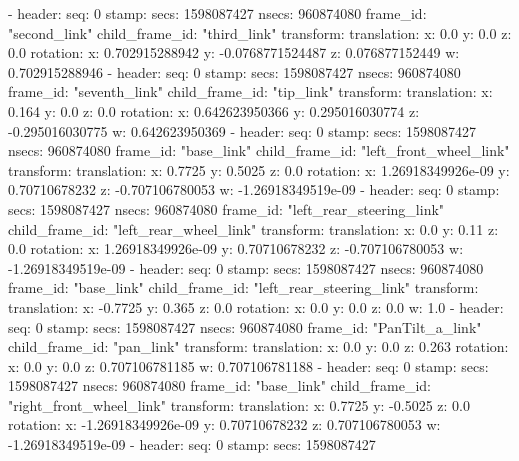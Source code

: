   - 
    header: 
      seq: 0
      stamp: 
        secs: 1598087427
        nsecs: 960874080
      frame_id: "second_link"
    child_frame_id: "third_link"
    transform: 
      translation: 
        x: 0.0
        y: 0.0
        z: 0.0
      rotation: 
        x: 0.702915288942
        y: -0.0768771524487
        z: 0.076877152449
        w: 0.702915288946
  - 
    header: 
      seq: 0
      stamp: 
        secs: 1598087427
        nsecs: 960874080
      frame_id: "seventh_link"
    child_frame_id: "tip_link"
    transform: 
      translation: 
        x: 0.164
        y: 0.0
        z: 0.0
      rotation: 
        x: 0.642623950366
        y: 0.295016030774
        z: -0.295016030775
        w: 0.642623950369
  - 
    header: 
      seq: 0
      stamp: 
        secs: 1598087427
        nsecs: 960874080
      frame_id: "base_link"
    child_frame_id: "left_front_wheel_link"
    transform: 
      translation: 
        x: 0.7725
        y: 0.5025
        z: 0.0
      rotation: 
        x: 1.26918349926e-09
        y: 0.70710678232
        z: -0.707106780053
        w: -1.26918349519e-09
  - 
    header: 
      seq: 0
      stamp: 
        secs: 1598087427
        nsecs: 960874080
      frame_id: "left_rear_steering_link"
    child_frame_id: "left_rear_wheel_link"
    transform: 
      translation: 
        x: 0.0
        y: 0.11
        z: 0.0
      rotation: 
        x: 1.26918349926e-09
        y: 0.70710678232
        z: -0.707106780053
        w: -1.26918349519e-09
  - 
    header: 
      seq: 0
      stamp: 
        secs: 1598087427
        nsecs: 960874080
      frame_id: "base_link"
    child_frame_id: "left_rear_steering_link"
    transform: 
      translation: 
        x: -0.7725
        y: 0.365
        z: 0.0
      rotation: 
        x: 0.0
        y: 0.0
        z: 0.0
        w: 1.0
  - 
    header: 
      seq: 0
      stamp: 
        secs: 1598087427
        nsecs: 960874080
      frame_id: "PanTilt_a_link"
    child_frame_id: "pan_link"
    transform: 
      translation: 
        x: 0.0
        y: 0.0
        z: 0.263
      rotation: 
        x: 0.0
        y: 0.0
        z: 0.707106781185
        w: 0.707106781188
  - 
    header: 
      seq: 0
      stamp: 
        secs: 1598087427
        nsecs: 960874080
      frame_id: "base_link"
    child_frame_id: "right_front_wheel_link"
    transform: 
      translation: 
        x: 0.7725
        y: -0.5025
        z: 0.0
      rotation: 
        x: -1.26918349926e-09
        y: 0.70710678232
        z: 0.707106780053
        w: -1.26918349519e-09
  - 
    header: 
      seq: 0
      stamp: 
        secs: 1598087427
